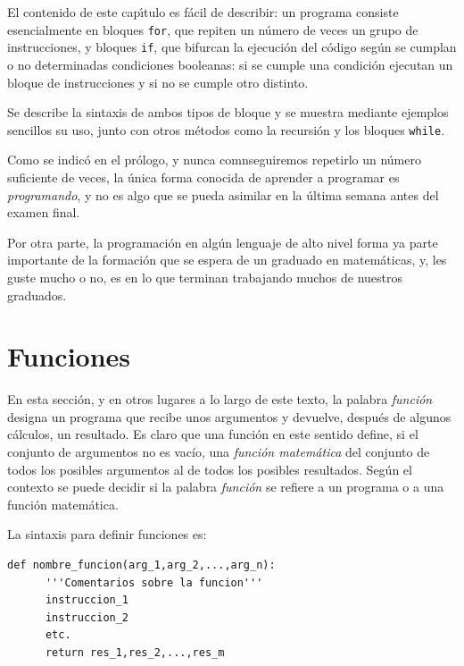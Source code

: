 El contenido de este cap\'{\i}tulo es f\'acil de describir: un programa consiste
esencialmente en bloques \lstinline|for|, que repiten un n\'umero de veces un
grupo de instrucciones, y bloques \lstinline|if|, que bifurcan la ejecuci\'on
del c\'odigo seg\'un se cumplan o no determinadas condiciones booleanas: si se
cumple una condici\'on ejecutan un bloque de instrucciones y si no se cumple
otro distinto. 

Se describe la sintaxis de ambos tipos de bloque y se muestra mediante ejemplos
sencillos su uso, junto con otros m\'etodos como la recursi\'on y los bloques
\lstinline|while|. 

Como se indic\'o en el pr\'ologo, y nunca comnseguiremos repetirlo un n\'umero
suficiente de veces,  la \'unica forma conocida de aprender a programar es
{\itshape programando}, y no es algo que se pueda asimilar en la \'ultima semana
antes del examen final.

Por otra parte, la programaci\'on en alg\'un lenguaje de alto nivel forma ya
parte importante de la formaci\'on que se espera de un graduado en
matem\'aticas, y, les guste mucho o no, es en lo que terminan trabajando muchos
de nuestros graduados.





\section{Funciones}\label{sect-funciones}
En esta sección, y en otros lugares a lo largo de este texto, la palabra
{\itshape función} designa un programa que recibe unos argumentos y devuelve,
después de algunos cálculos, un resultado.  Es claro que una función en
este sentido define, si el conjunto de argumentos no es vacío,  una
{\itshape función matemática} del conjunto de todos los posibles argumentos
al de todos los posibles resultados. Según el contexto se puede decidir si la
palabra {\itshape función} se refiere a un programa o a una función
matemática. 

La sintaxis para definir funciones es:

\begin{lstlisting}
def nombre_funcion(arg_1,arg_2,...,arg_n):
      '''Comentarios sobre la funcion'''
      instruccion_1
      instruccion_2
      etc.
      return res_1,res_2,...,res_m
\end{lstlisting}



